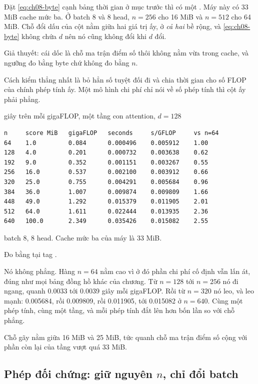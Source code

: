 %
Đặt \eqref{eq:ch08-byte} cạnh bảng thời gian ở mục trước thì có một
.
Máy này có 33 MiB cache mức ba. Ở batch 8 và 8 head, \(n = 256\) cho 16 MiB và
\(n = 512\) cho 64 MiB. Chỗ đổi dấu của cột  nằm giữa hai giá
trị ấy, ở \emph{cả hai} bề rộng, và \eqref{eq:ch08-byte} không chứa \(d\) nên nó
cũng không đổi khi \(d\) đổi.

Giả thuyết: cái dốc là chỗ ma trận điểm số thôi không nằm vừa trong cache, và
ngưỡng đo bằng byte chứ không đo bằng \(n\).

Cách kiểm thẳng nhất là bỏ hẳn số tuyệt đối đi và chia thời gian cho số FLOP của
chính phép tính ấy. Một mô hình chi phí chỉ nói về số phép tính thì cột ấy phải
phẳng.

\begin{measured}{giây trên mỗi gigaFLOP, một tầng con attention, \(d = 128\)}
\begin{verbatim}
n     score MiB   gigaFLOP   seconds     s/GFLOP     vs n=64
64    1.0         0.084      0.000496    0.005912    1.00
128   4.0         0.201      0.000732    0.003638    0.62
192   9.0         0.352      0.001151    0.003267    0.55
256   16.0        0.537      0.002100    0.003912    0.66
320   25.0        0.755      0.004291    0.005684    0.96
384   36.0        1.007      0.009874    0.009809    1.66
448   49.0        1.292      0.015379    0.011905    2.01
512   64.0        1.611      0.022444    0.013935    2.36
640   100.0       2.349      0.035426    0.015082    2.55
\end{verbatim}

batch 8, 8 head. Cache mức ba của máy là 33 MiB.

Đo bằng  tại tag .
\end{measured}

Nó không phẳng. Hàng \(n = 64\) nằm cao vì ở đó phần chi phí cố định vẫn lấn át,
đúng như mọi bảng đồng hồ khác của chương. Từ \(n = 128\) tới \(n = 256\) nó đi
ngang, quanh 0.0033 tới 0.0039 giây mỗi gigaFLOP. Rồi từ \(n = 320\) nó leo, và
leo mạnh: 0.005684, rồi 0.009809, rồi 0.011905, tới 0.015082 ở \(n = 640\). Cùng
một phép tính, cùng một tầng, và mỗi phép tính đắt lên hơn bốn lần so với chỗ
phẳng.

Chỗ gãy nằm giữa 16 MiB và 25 MiB, tức quanh chỗ ma trận điểm số cộng với phần
còn lại của tầng vượt quá 33 MiB.

\subsection*{Phép đối chứng: giữ nguyên \texorpdfstring{\(n\)}{n}, chỉ đổi batch}

